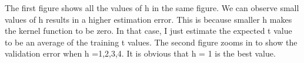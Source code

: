 \documentclass[paper=a4, fontsize=11pt]{article} %
\begin{document}
The first figure shows all the values of h in the same figure. We can observe small values of h results in a higher estimation error.
This is because smaller h makes the kernel function to be zero. In that case, I just estimate the expected t value to be an average of the training t values.
The second figure zooms in to show the validation error when h =1,2,3,4. It is obvious that h = 1 is the best value.
\end{document}
